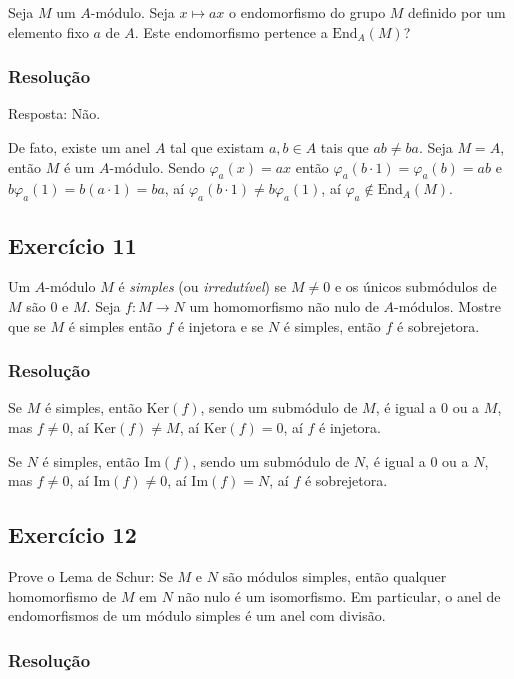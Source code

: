 \documentclass[10pt,a4paper]{article}
\begin{document}
Seja $M$ um $A$-módulo. Seja $x\mapsto ax$ o endomorfismo do grupo $M$ definido por um elemento fixo $a$ de $A$. Este endomorfismo pertence a $\mathrm{End}_A(M)$?

\subsubsection*{Resolução}

Resposta: Não.

\medskip
\noindent
De fato, existe um anel $A$ tal que existam $a,b\in A$ tais que $ab\neq ba$. Seja $M=A$, então $M$ é um $A$-módulo. Sendo $\varphi_a(x)=ax$ então $\varphi_a(b\cdot1)=\varphi_a(b)=ab$ e $b\varphi_a(1)=b(a\cdot1)=ba$, aí $\varphi_a(b\cdot1)\neq b\varphi_a(1)$, aí $\varphi_a\notin\mathrm{End}_A(M)$.

\subsection*{Exercício 11}

Um $A$-módulo $M$ é \textit{simples} (ou \textit{irredutível}) se $M\neq 0$ e os únicos submódulos de $M$ são $0$ e $M$. Seja $f:M\rightarrow N$ um homomorfismo não nulo de $A$-módulos. Mostre que se $M$ é simples então $f$ é injetora e se $N$ é simples, então $f$ é sobrejetora.

\subsubsection*{Resolução}

Se $M$ é simples, então $\mathrm{Ker}(f)$, sendo um submódulo de $M$, é igual a $0$ ou a $M$, mas $f\neq 0$, aí $\mathrm{Ker}(f)\neq M$, aí $\mathrm{Ker}(f)=0$, aí $f$ é injetora.

\medskip
\noindent
Se $N$ é simples, então $\mathrm{Im}(f)$, sendo um submódulo de $N$, é igual a $0$ ou a $N$, mas $f\neq 0$, aí $\mathrm{Im}(f)\neq 0$, aí $\mathrm{Im}(f)=N$, aí $f$ é sobrejetora.

\subsection*{Exercício 12}

Prove o Lema de Schur: Se $M$ e $N$ são módulos simples, então qualquer homomorfismo de $M$ em $N$ não nulo é um isomorfismo. Em particular, o anel de endomorfismos de um módulo simples é um anel com divisão.

\subsubsection*{Resolução}
\end{document}
